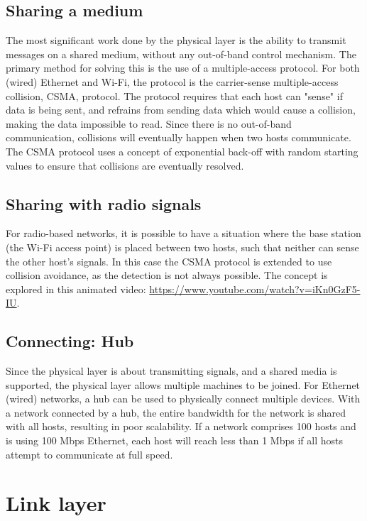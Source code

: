 \subsection{Sharing a medium}
The most significant work done by the physical layer is the ability to transmit messages on a shared medium, without any out-of-band control mechanism. The primary method for solving this is the use of a multiple-access protocol. For both (wired) Ethernet and Wi-Fi, the protocol is the carrier-sense multiple-access collision, CSMA, protocol. The protocol requires that each host can "sense" if data is being sent, and refrains from sending data which would cause a collision, making the data impossible to read. Since there is no out-of-band communication, collisions will eventually happen when two hosts communicate. The CSMA protocol uses a concept of exponential back-off with random starting values to ensure that collisions are eventually resolved.

\subsection{Sharing with radio signals}
For radio-based networks, it is possible to have a situation where the base station (the Wi-Fi access point) is placed between two hosts, such that neither can sense the other host's signals. In this case the CSMA protocol is extended to use collision avoidance, as the detection is not always possible. The concept is explored in this animated video: \url{https://www.youtube.com/watch?v=iKn0GzF5-IU}.

\subsection{Connecting: Hub}
Since the physical layer is about transmitting signals, and a shared media is supported, the physical layer allows multiple machines to be joined. For Ethernet (wired) networks, a hub can be used to physically connect multiple devices. With a network connected by a hub, the entire bandwidth for the network is shared with all hosts, resulting in poor scalability. If a network comprises 100 hosts and is using 100 Mbps Ethernet, each host will reach less than 1 Mbps if all hosts attempt to communicate at full speed.

\section{Link layer}

